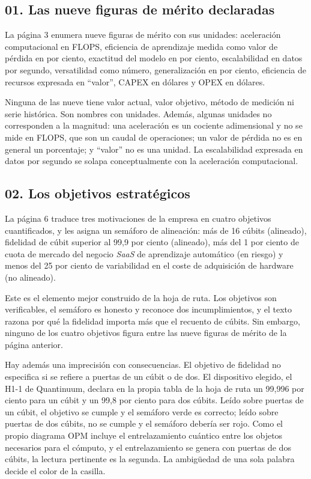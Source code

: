 \documentclass[11pt,letterpaper]{article}
\begin{document}
\subsection*{01. Las nueve figuras de mérito declaradas}

La página 3 enumera nueve figuras de mérito con sus unidades: aceleración
computacional en FLOPS, eficiencia de aprendizaje medida como valor de pérdida
en por ciento, exactitud del modelo en por ciento, escalabilidad en datos por
segundo, versatilidad como número, generalización en por ciento, eficiencia de
recursos expresada en \enquote{valor}, CAPEX en dólares y OPEX en dólares.

Ninguna de las nueve tiene valor actual, valor objetivo, método de medición ni
serie histórica. Son nombres con unidades. Además, algunas unidades no
corresponden a la magnitud: una aceleración es un cociente adimensional y no se
mide en FLOPS, que son un caudal de operaciones; un valor de pérdida no es en
general un porcentaje; y \enquote{valor} no es una unidad. La escalabilidad
expresada en datos por segundo se solapa conceptualmente con la aceleración
computacional.

\subsection*{02. Los objetivos estratégicos}

La página 6 traduce tres motivaciones de la empresa en cuatro objetivos
cuantificados, y les asigna un semáforo de alineación: más de 16 cúbits
(alineado), fidelidad de cúbit superior al 99,9 por ciento (alineado), más del
1 por ciento de cuota de mercado del negocio \emph{SaaS} de aprendizaje
automático (en riesgo) y menos del 25 por ciento de variabilidad en el coste de
adquisición de hardware (no alineado).

Este es el elemento mejor construido de la hoja de ruta. Los objetivos son
verificables, el semáforo es honesto y reconoce dos incumplimientos, y el texto
razona por qué la fidelidad importa más que el recuento de cúbits. Sin embargo,
ninguno de los cuatro objetivos figura entre las nueve figuras de mérito de la
página anterior.

Hay además una imprecisión con consecuencias. El objetivo de fidelidad no
especifica si se refiere a puertas de un cúbit o de dos. El dispositivo elegido,
el H1-1 de Quantinuum, declara en la propia tabla de la hoja de ruta un 99,996
por ciento para un cúbit y un 99,8 por ciento para dos cúbits. Leído sobre
puertas de un cúbit, el objetivo se cumple y el semáforo verde es correcto;
leído sobre puertas de dos cúbits, no se cumple y el semáforo debería ser rojo.
Como el propio diagrama OPM incluye el entrelazamiento cuántico entre los
objetos necesarios para el cómputo, y el entrelazamiento se genera con puertas
de dos cúbits, la lectura pertinente es la segunda. La ambigüedad de una sola
palabra decide el color de la casilla.
\end{document}
